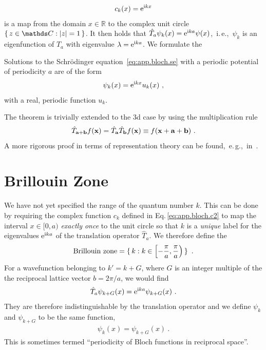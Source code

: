 \begin{align}
	c_k (x) = {\rm e}^{\im k x}
	\label{eq:app.bloch.c2}
\end{align}
is a map from the domain $x \in \mathds R$ to the complex unit circle $\set{z \in \mathds C : \lvert z \rvert = 1}$. 
It then holds that $\hat T_a \psi_k (x) = {\rm e}^{{\rm i} k a} \psi(x)$,~i.\,e.,~$\psi_k$ is an eigenfunction of $\hat T_a$ with eigenvalue $\lambda = {\rm e}^{{\rm i} k a}$. We formulate the
\begin{thm}[Bloch]
	Solutions to the Schr\"odinger equation~\eqref{eq:app.bloch.se} with a periodic potential of periodicity $a$ are of the form
	\begin{align*}
		\psi_k (x) = {\rm e}^{{\rm i} k x} u_k (x)~,
	\end{align*}
	with a real, periodic function $u_k$.
\end{thm}
The theorem is trivially extended to the 3d case by using the multiplication rule
\begin{align}
	\hat{T}_{{\bf a} + {\bf b}} f({\bf x}) = \hat{T}_{\bf a} \hat{T}_{\bf b} f({\bf x}) \equiv f({\bf x} + {\bf a} + {\bf b})~.
\end{align}
A more rigorous proof in terms of representation theory can be found,~e.\,g.,~in~\cite{Dresselhaus2007}.

\section{Brillouin Zone}
\label{sec:BrillouinZone}
We have not yet specified the range of the quantum number $k$. This can be done by requiring the complex function $c_k$ defined in Eq.\,\eqref{eq:app.bloch.c2} to map the interval $x \in [0, a)$ \emph{exactly once} to the unit circle so that $k$ is a \emph{unique} label for the eigenvalues ${\rm e}^{{\rm i} k a}$ of the translation operator $\hat T_a$.
We therefore define the
\begin{align}
	\text{Brillouin zone} = \set{k : k \in \left[ - \frac{\pi}{a}, \frac{\pi}{a}\right)}~.
\end{align}
For a wavefunction belonging to $k' = k + G$, where $G$ is an integer multiple of the the reciprocal lattice vector $b = 2\pi / a$, we would find
\begin{align}
	\hat T_a \psi_{k + G} (x) = {\rm e}^{{\rm i} k a} \psi_{k + G} (x)~.
\end{align}
They are therefore indistinguishable by the translation operator and we define $\psi_k$ and $\psi_{k+G}$ to be the same function,
\begin{align}
	\psi_k (x) = \psi_{k + G} (x)~.
\end{align}
This is sometimes termed ``periodicity of Bloch functions in reciprocal space''.

